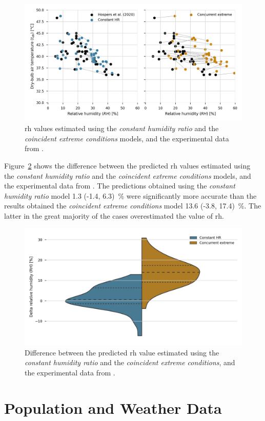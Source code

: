 \begin{figure}[h]
    \centering
    \includegraphics[width=\textwidth]{figures/scatter_comparison_prediction}
    \caption{\ac{rh} values estimated using the \textit{constant humidity ratio} and the \textit{coincident extreme conditions} models, and the experimental data from .}
    \label{fig:scatter_comparison_prediction}
\end{figure}

Figure~\ref{fig:delta_rh} shows the difference between the predicted \ac{rh} values estimated using the \textit{constant humidity ratio} and the \textit{coincident extreme conditions} models, and the experimental data from .
The predictions obtained using the \textit{constant humidity ratio} model 1.3 (-1.4, 6.3)~\% were significantly more accurate than the results obtained the \textit{coincident extreme conditions} model 13.6 (-3.8, 17.4)~\%.
The latter in the great majority of the cases overestimated the value of \ac{rh}.

\begin{figure}[h]
    \centering
    \includegraphics[width=\textwidth]{figures/delta_rh}
    \caption{Difference between the predicted \ac{rh} value estimated using the \textit{constant humidity ratio} and the \textit{coincident extreme conditions}, and the experimental data from .}
    \label{fig:delta_rh}
\end{figure}

\section{Population and Weather Data}\label{sec:pop_weather}



\clearpage